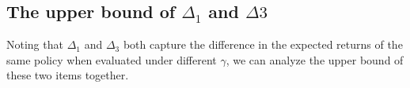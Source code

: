 








\subsection{The upper bound of $\Delta_1$ and $\Delta3$}
Noting that $\Delta_1$ and $\Delta_3$ both capture the difference in the expected returns of the same policy when evaluated under different $\gamma$, we can analyze the upper bound of these two items together.

